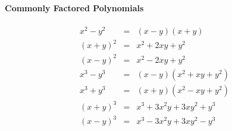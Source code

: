 \paragraph{Commonly Factored Polynomials}

$$
\begin{array}{lcl}
		{x^2-y^2} &=& (x-y)(x+y) \\
		{(x+y)^2} &=& x^2+2xy+y^2\\
		{(x-y)^2} &=& x^2-2xy+y^2\\
		{x^3-y^3} &=& (x-y)(x^2+xy+y^2)\\
		{x^3+y^3} &=& (x+y)(x^2-xy+y^2)\\
		{(x+y)^3} &=& x^3+3x^2y+3xy^2+y^3\\
		{(x-y)^3} &=& x^3-3x^2y+3xy^2-y^3\\
\end{array}
$$


